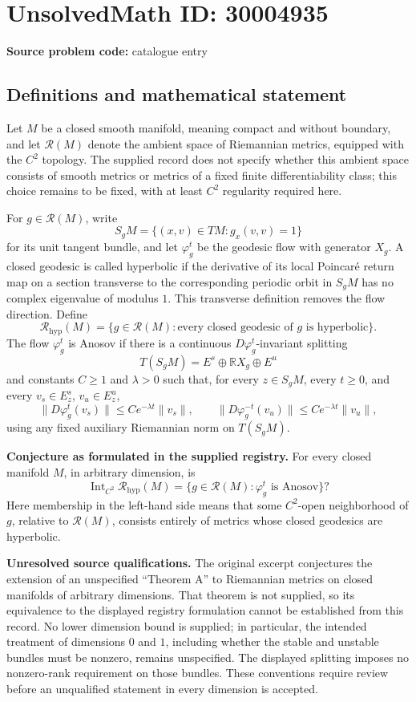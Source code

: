 \documentclass[11pt]{article}
\newcommand{\R}{\mathbb{R}}
\begin{document}
\section*{UnsolvedMath ID: 30004935}
\textbf{Source problem code:} catalogue entry
\subsection{Definitions and mathematical statement}
Let \(M\) be a closed smooth manifold, meaning compact and without boundary, and let \(\mathcal R(M)\) denote the ambient space of Riemannian metrics, equipped with the \(C^2\) topology. The supplied record does not specify whether this ambient space consists of smooth metrics or metrics of a fixed finite differentiability class; this choice remains to be fixed, with at least \(C^2\) regularity required here.

For \(g\in\mathcal R(M)\), write
\[
S_gM=\{(x,v)\in TM:g_x(v,v)=1\}
\]
for its unit tangent bundle, and let \(\varphi_g^t\) be the geodesic flow with generator \(X_g\). A closed geodesic is called hyperbolic if the derivative of its local Poincar\'e return map on a section transverse to the corresponding periodic orbit in \(S_gM\) has no complex eigenvalue of modulus \(1\). This transverse definition removes the flow direction. Define
\[
\mathcal R_{\mathrm{hyp}}(M)
=\{g\in\mathcal R(M):\text{every closed geodesic of }g\text{ is hyperbolic}\}.
\]
The flow \(\varphi_g^t\) is Anosov if there is a continuous \(D\varphi_g^t\)-invariant splitting
\[
T(S_gM)=E^s\oplus\R X_g\oplus E^u
\]
and constants \(C\geq1\) and \(\lambda>0\) such that, for every \(z\in S_gM\), every \(t\geq0\), and every \(v_s\in E_z^s\), \(v_u\in E_z^u\),
\[
\|D\varphi_g^t(v_s)\|\leq C e^{-\lambda t}\|v_s\|,
\qquad
\|D\varphi_g^{-t}(v_u)\|\leq C e^{-\lambda t}\|v_u\|,
\]
using any fixed auxiliary Riemannian norm on \(T(S_gM)\).

\textbf{Conjecture as formulated in the supplied registry.} For every closed manifold \(M\), in arbitrary dimension, is
\[
\operatorname{Int}_{C^2}\mathcal R_{\mathrm{hyp}}(M)
=
\{g\in\mathcal R(M):\varphi_g^t\text{ is Anosov}\}?
\]
Here membership in the left-hand side means that some \(C^2\)-open neighborhood of \(g\), relative to \(\mathcal R(M)\), consists entirely of metrics whose closed geodesics are hyperbolic.

\textbf{Unresolved source qualifications.} The original excerpt conjectures the extension of an unspecified ``Theorem A'' to Riemannian metrics on closed manifolds of arbitrary dimensions. That theorem is not supplied, so its equivalence to the displayed registry formulation cannot be established from this record. No lower dimension bound is supplied; in particular, the intended treatment of dimensions \(0\) and \(1\), including whether the stable and unstable bundles must be nonzero, remains unspecified. The displayed splitting imposes no nonzero-rank requirement on those bundles. These conventions require review before an unqualified statement in every dimension is accepted.
\end{document}

